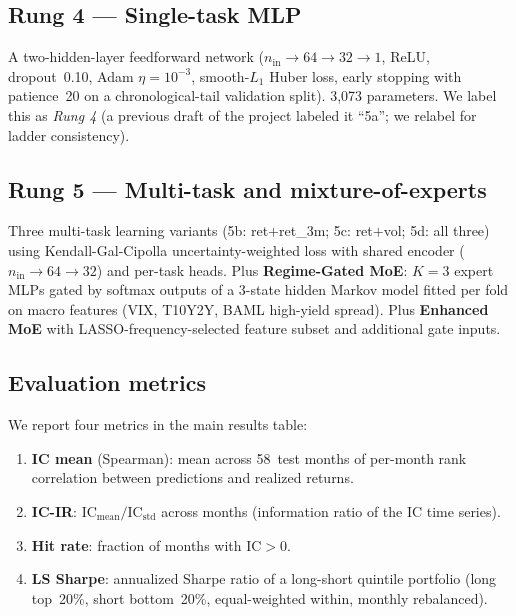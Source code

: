 \documentclass[11pt]{article}
\begin{document}
\subsection{Rung 4 --- Single-task MLP}

A two-hidden-layer feedforward network ($n_\text{in}\to 64\to 32\to 1$,
ReLU, dropout~0.10, Adam $\eta=10^{-3}$, smooth-$L_1$ Huber loss,
early stopping with patience~20 on a chronological-tail validation
split). 3{,}073 parameters. We label this as \emph{Rung 4} (a previous
draft of the project labeled it ``5a''; we relabel for ladder
consistency).

\subsection{Rung 5 --- Multi-task and mixture-of-experts}

Three multi-task learning variants (5b: ret$+$ret\_3m; 5c: ret$+$vol;
5d: all three) using Kendall-Gal-Cipolla uncertainty-weighted loss
\citep{kendall_gal_cipolla} with shared encoder
($n_\text{in}\to 64\to 32$) and per-task heads. Plus
\textbf{Regime-Gated MoE}: $K=3$ expert MLPs gated by softmax outputs
of a 3-state hidden Markov model fitted per fold on macro features
(VIX, T10Y2Y, BAML high-yield spread). Plus \textbf{Enhanced MoE} with
LASSO-frequency-selected feature subset and additional gate inputs.

\subsection{Evaluation metrics}

We report four metrics in the main results table:
\begin{enumerate}[leftmargin=2em,topsep=2pt,itemsep=2pt]
\item \textbf{IC mean} (Spearman): mean across 58~test months of
  per-month rank correlation between predictions and realized returns.
\item \textbf{IC-IR}: $\text{IC}_\text{mean}/\text{IC}_\text{std}$
  across months (information ratio of the IC time series).
\item \textbf{Hit rate}: fraction of months with $\text{IC}>0$.
\item \textbf{LS Sharpe}: annualized Sharpe ratio of a long-short
  quintile portfolio (long top~20\%, short bottom~20\%, equal-weighted
  within, monthly rebalanced).
\end{enumerate}

\end{document}
